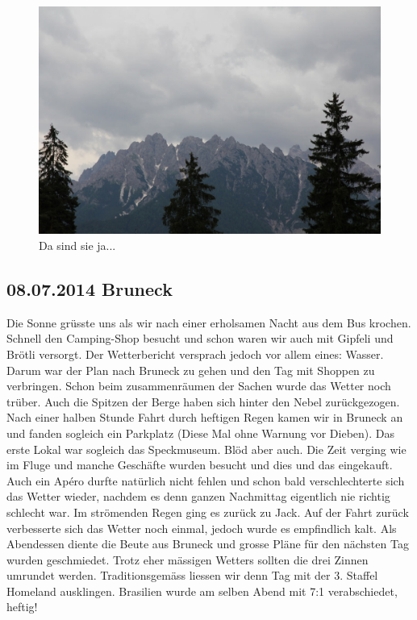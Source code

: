 \begin{figure}[hb]
    \centering
    \includegraphics[width=\textwidth]{../Bilder/Dolomiten/7.jpg}
    \caption{Da sind sie ja...}
    \label{img:Dolomiten}
\end{figure}

\subsection{08.07.2014 Bruneck}
Die Sonne grüsste uns als wir nach einer erholsamen Nacht aus dem Bus krochen.
Schnell den Camping-Shop besucht und schon waren wir auch mit Gipfeli und Brötli versorgt.
Der Wetterbericht versprach jedoch vor allem eines: Wasser.
Darum war der Plan nach Bruneck zu gehen und den Tag mit Shoppen zu verbringen.
Schon beim zusammenräumen der Sachen wurde das Wetter noch trüber.
Auch die Spitzen der Berge haben sich hinter den Nebel zurückgezogen.
Nach einer halben Stunde Fahrt durch heftigen Regen kamen wir in Bruneck an und fanden sogleich ein Parkplatz (Diese Mal ohne Warnung vor Dieben).
Das erste Lokal war sogleich das Speckmuseum.
Blöd aber auch.
Die Zeit verging wie im Fluge und manche Geschäfte wurden besucht und dies und das eingekauft.
Auch ein Apéro durfte natürlich nicht fehlen und schon bald verschlechterte sich das Wetter wieder, nachdem es denn ganzen Nachmittag eigentlich nie richtig schlecht war.
Im strömenden Regen ging es zurück zu Jack.
Auf der Fahrt zurück verbesserte sich das Wetter noch einmal, jedoch wurde es empfindlich kalt.
Als Abendessen diente die Beute aus Bruneck und grosse Pläne für den nächsten Tag wurden geschmiedet.
Trotz eher mässigen Wetters sollten die drei Zinnen umrundet werden.
Traditionsgemäss liessen wir denn Tag mit der 3.
Staffel Homeland ausklingen.
Brasilien wurde am selben Abend mit 7:1 verabschiedet, heftig!

